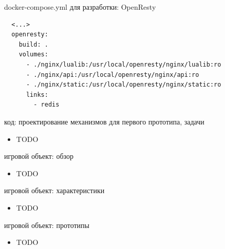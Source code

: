 \documentclass[aspectratio=169,handout,bigger]{beamer}
\begin{document}

\begin{frame}[fragile]{docker-compose.yml для разработки: OpenResty}
\begin{verbatim}
  <...>
  openresty:
    build: .
    volumes:
      - ./nginx/lualib:/usr/local/openresty/nginx/lualib:ro
      - ./nginx/api:/usr/local/openresty/nginx/api:ro
      - ./nginx/static:/usr/local/openresty/nginx/static:ro
      links:
        - redis
\end{verbatim}
\end{frame}


\begin{frame}{код: проектирование механизмов для первого прототипа, задачи}
  \begin{itemize}
    \item TODO
  \end{itemize}
\end{frame}


\begin{frame}{игровой объект: обзор}
  \begin{itemize}
    \item TODO
  \end{itemize}
\end{frame}


\begin{frame}{игровой объект: характеристики}
  \begin{itemize}
    \item TODO
  \end{itemize}
\end{frame}


\begin{frame}{игровой объект: прототипы}
  \begin{itemize}
    \item TODO
  \end{itemize}
\end{frame}

\end{document}

